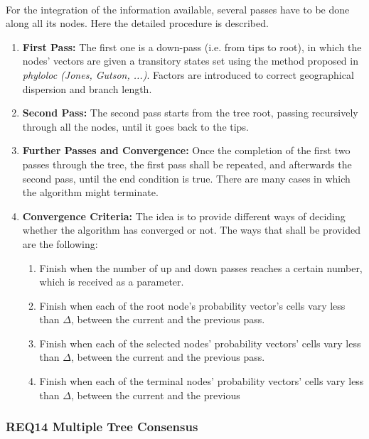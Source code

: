 \documentclass[10pt,a4paper]{article}
\begin{document}
\paragraph{}
	For the integration of the information available, several passes have to be done along all its nodes. Here the detailed procedure is described.
  \begin{enumerate}
    \item \textbf{First Pass: }
	The first one is a down-pass (i.e. from tips to root), in which the nodes' vectors are given a transitory states set using the method proposed in \emph{phyloloc (Jones, Gutson, ...)}. Factors are introduced to correct geographical dispersion and branch length.


    \item \textbf{Second Pass: }
The second pass starts from the tree root, passing recursively through all the nodes, until it goes back to the tips.
    \item \textbf{Further Passes and Convergence: }
Once the completion of the first two passes through the tree, the first pass shall be repeated, and afterwards the second pass, until the end condition is true. There are many cases in which the algorithm might terminate. 
    \item \textbf{Convergence Criteria: }
	The idea is to provide different ways of deciding whether the algorithm has converged or not. The ways that shall be provided are the following:
		\begin{enumerate}
		    \item Finish when the number of up and down passes reaches a certain number, which is received as a parameter.
		    \item Finish when each of the root node's probability vector's cells vary less than $\Delta$, between the current and the previous pass.
		    \item Finish when each of the selected nodes' probability vectors' cells vary less than $\Delta$, between the current and the previous pass.
		    \item Finish when each of the terminal nodes' probability vectors' cells vary less than $\Delta$, between the current and the previous 
		  \end{enumerate}

  \end{enumerate}


  \subsubsection{REQ14 Multiple Tree Consensus}
\end{document}
